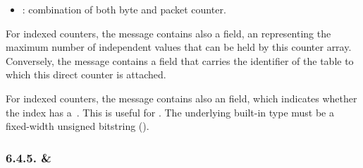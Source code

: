\documentclass[11pt]{article}
\begin{document}
{\begin{itemize}
\begin{itemize}[noitemsep,topsep=\mdcompacttopsep]
\item{}: combination of both byte and packet counter.%
\end{itemize}%
\end{itemize}%

\noindent{}For indexed counters, the  message contains also a  field, an
 representing the maximum number of independent values that can be held
by this counter array. Conversely, the  message contains a
 field that carries the  identifier of the table to
which this direct counter is attached.%

For indexed counters, the  message contains also an 
field, which indicates whether the index has a~. This is useful for
. The underlying built-in type must
be a fixed-width unsigned bitstring ().%

\subsubsection{6.4.5.\hspace*{0.5em} \& }\label{sec-meter-directmeter}%

}
\end{document}
